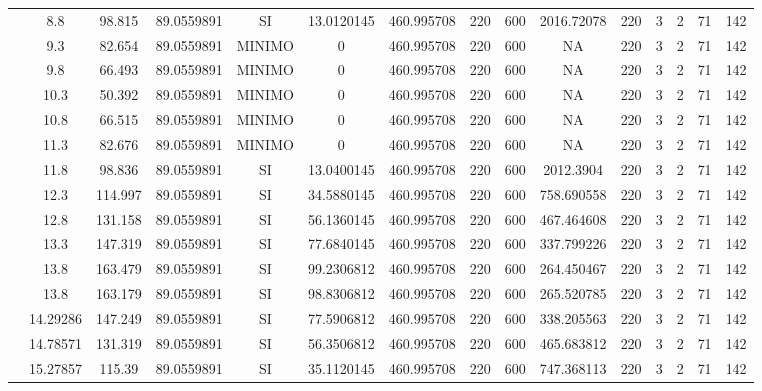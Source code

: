 \begin{table}[H]
{\begin{tabular}{|c|c|c|c|c|c|c|c|c|c|c|c|c|c|c|}
\cline{2-15}    & 8.8 & 98.815 & 89.0559891 & SI  & 13.0120145 & 460.995708 & 220 & 600 & 2016.72078 & 220 & 3   & 2   & 71  & 142 \bigstrut\\
\cline{2-15}    & 9.3 & 82.654 & 89.0559891 & MINIMO & 0   & 460.995708 & 220 & 600 & NA  & 220 & 3   & 2   & 71  & 142 \bigstrut\\
\cline{2-15}    & 9.8 & 66.493 & 89.0559891 & MINIMO & 0   & 460.995708 & 220 & 600 & NA  & 220 & 3   & 2   & 71  & 142 \bigstrut\\
\cline{2-15}    & 10.3 & 50.392 & 89.0559891 & MINIMO & 0   & 460.995708 & 220 & 600 & NA  & 220 & 3   & 2   & 71  & 142 \bigstrut\\
\cline{2-15}    & 10.8 & 66.515 & 89.0559891 & MINIMO & 0   & 460.995708 & 220 & 600 & NA  & 220 & 3   & 2   & 71  & 142 \bigstrut\\
\cline{2-15}    & 11.3 & 82.676 & 89.0559891 & MINIMO & 0   & 460.995708 & 220 & 600 & NA  & 220 & 3   & 2   & 71  & 142 \bigstrut\\
\cline{2-15}    & 11.8 & 98.836 & 89.0559891 & SI  & 13.0400145 & 460.995708 & 220 & 600 & 2012.3904 & 220 & 3   & 2   & 71  & 142 \bigstrut\\
\cline{2-15}    & 12.3 & 114.997 & 89.0559891 & SI  & 34.5880145 & 460.995708 & 220 & 600 & 758.690558 & 220 & 3   & 2   & 71  & 142 \bigstrut\\
\cline{2-15}    & 12.8 & 131.158 & 89.0559891 & SI  & 56.1360145 & 460.995708 & 220 & 600 & 467.464608 & 220 & 3   & 2   & 71  & 142 \bigstrut\\
\cline{2-15}    & 13.3 & 147.319 & 89.0559891 & SI  & 77.6840145 & 460.995708 & 220 & 600 & 337.799226 & 220 & 3   & 2   & 71  & 142 \bigstrut\\
\cline{2-15}    & 13.8 & 163.479 & 89.0559891 & SI  & 99.2306812 & 460.995708 & 220 & 600 & 264.450467 & 220 & 3   & 2   & 71  & 142 \bigstrut\\
\cline{2-15}    & 13.8 & 163.179 & 89.0559891 & SI  & 98.8306812 & 460.995708 & 220 & 600 & 265.520785 & 220 & 3   & 2   & 71  & 142 \bigstrut\\
\cline{2-15}    & 14.29286 & 147.249 & 89.0559891 & SI  & 77.5906812 & 460.995708 & 220 & 600 & 338.205563 & 220 & 3   & 2   & 71  & 142 \bigstrut\\
\cline{2-15}    & 14.78571 & 131.319 & 89.0559891 & SI  & 56.3506812 & 460.995708 & 220 & 600 & 465.683812 & 220 & 3   & 2   & 71  & 142 \bigstrut\\
\cline{2-15}    & 15.27857 & 115.39 & 89.0559891 & SI  & 35.1120145 & 460.995708 & 220 & 600 & 747.368113 & 220 & 3   & 2   & 71  & 142 \bigstrut\\

\end{tabular}}
\end{table}

